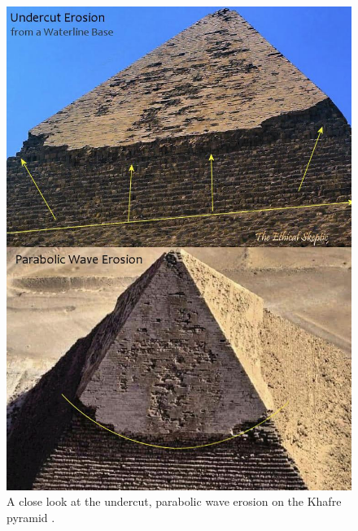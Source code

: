 \documentclass[10pt,twocolumn,letterpaper]{article}
\begin{document}
\begin{figure}[H]
\begin{center}
   \includegraphics[width=1\linewidth]{wave.jpg}
\end{center}
   \caption{A close look at the undercut, parabolic wave erosion on the Khafre pyramid \cite{27}.}
\label{fig:19}
\label{fig:onecol}
\end{figure}
\end{document}
